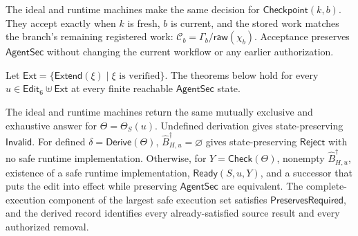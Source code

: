 \begin{theorem}
\label{thm:exact-checkpoint}
The ideal and runtime machines make the same decision for \(\mathsf{Checkpoint}(k,b)\).
They accept exactly when \(k\) is fresh, \(b\) is current, and the stored work matches the branch's remaining registered work: \(\mathcal C_b=\Gamma_b/\mathsf{raw}(\chi_b)\).
Acceptance preserves \(\mathsf{AgentSec}\) without changing the current workflow or any earlier authorization.
\end{theorem}

Let \(\mathsf{Ext}=\{\mathsf{Extend}(\xi)\mid \xi\text{ is verified}\}\).
The theorems below hold for every \(u\in\mathsf{Edit}_6\uplus\mathsf{Ext}\) at every finite reachable \(\mathsf{AgentSec}\) state.

\begin{theorem}
\label{thm:exact-checking}
The ideal and runtime machines return the same mutually exclusive and exhaustive answer for \(\Theta=\Theta_S(u)\).
Undefined derivation gives state-preserving \(\mathsf{Invalid}\).
For defined \(\delta=\mathsf{Derive}(\Theta)\), \(\widehat B^\dagger_{H,u}=\varnothing\) gives state-preserving \(\mathsf{Reject}\) with no safe runtime implementation.
Otherwise, for \(Y=\mathsf{Check}(\Theta)\), nonempty \(\widehat B^\dagger_{H,u}\), existence of a safe runtime implementation, \(\mathsf{Ready}(S,u,Y)\), and a successor that puts the edit into effect while preserving \(\mathsf{AgentSec}\) are equivalent.
The complete-execution component of the largest safe execution set satisfies \(\mathsf{PreservesRequired}\), and the derived record identifies every already-satisfied source result and every authorized removal.
\end{theorem}

